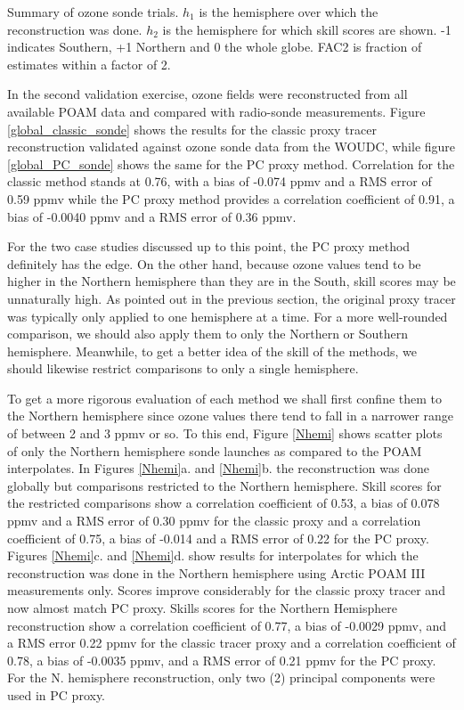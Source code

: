 \begin{table}
	\caption{Summary of ozone sonde trials. 
	$h_1$ is the hemisphere over which the reconstruction was done. 
$h_2$ is the hemisphere for which skill scores are shown.
-1 indicates Southern, +1 Northern and 0 the whole globe.
FAC2 is fraction of estimates within a factor of 2.}
	\label{summary}
	
\end{table}

In the second validation exercise, ozone fields were reconstructed from 
all available POAM data and compared with radio-sonde measurements.
Figure \ref{global_classic_sonde} shows the results for the classic proxy
tracer reconstruction validated against ozone sonde data from the WOUDC,
while figure \ref{global_PC_sonde} shows the same for the PC proxy method.
Correlation for the classic method stands at 0.76, with a bias of -0.074 ppmv
and a RMS error of 0.59 ppmv while the PC proxy method provides a correlation
coefficient of 0.91, a bias of -0.0040 ppmv and a RMS error of 0.36 ppmv.

For the two case studies discussed up to this point, 
the PC proxy method definitely has the edge. 
On the other hand, 
because ozone values tend to be higher in the Northern hemisphere than
they are in the South, skill scores may be unnaturally high.
As pointed out in the previous section, the original proxy tracer was 
typically only applied to one hemisphere at a time.
For a more well-rounded comparison, we should also apply them to only the
Northern or Southern hemisphere.
Meanwhile, to get a better idea of the skill of the methods, we should likewise
restrict comparisons to only a single hemisphere.

To get a more rigorous evaluation of each method we shall first confine them
to the Northern hemisphere
since ozone values there tend to fall in a narrower range of 
between 2 and 3 ppmv or so.
To this end, Figure \ref{Nhemi} shows scatter plots of only the
Northern hemisphere sonde launches as compared to the POAM interpolates.
In Figures \ref{Nhemi}a. and \ref{Nhemi}b. the reconstruction was done globally
but comparisons restricted to the Northern hemisphere.
Skill scores for the restricted comparisons show a correlation coefficient of 0.53,
a bias of 0.078 ppmv and a RMS error of 0.30 ppmv for the classic proxy
and a correlation coefficient of 0.75, a bias of -0.014 and a RMS error of 0.22 for
the PC proxy.
Figures \ref{Nhemi}c. and \ref{Nhemi}d. show results for interpolates for which the
reconstruction was done in the Northern hemisphere using 
Arctic POAM III measurements only.
Scores improve considerably for the classic proxy tracer and now almost
match PC proxy.
Skills scores for the Northern Hemisphere reconstruction show a correlation coefficient
of 0.77, a bias of -0.0029 ppmv, and a RMS error 0.22 ppmv for the classic
tracer proxy and a correlation coefficient of 0.78, a bias of -0.0035 ppmv,
and a RMS error of 0.21 ppmv for the PC proxy.
For the N. hemisphere reconstruction, only two (2) principal components were
used in PC proxy.

